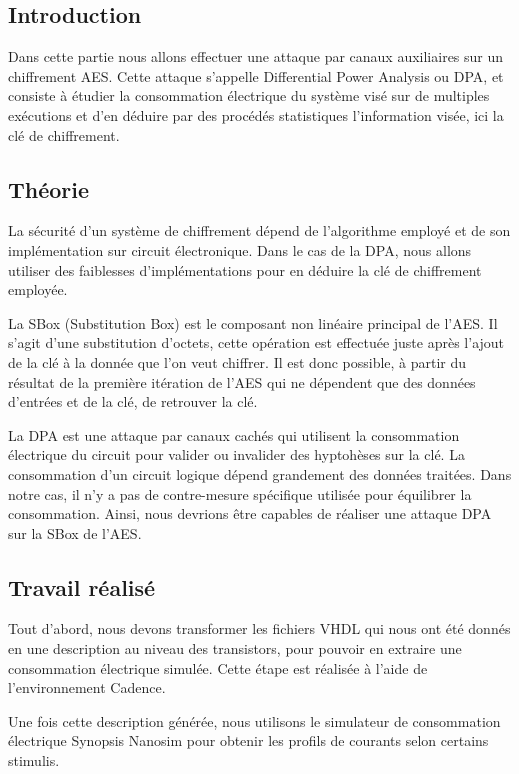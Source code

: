 \subsection{Introduction}

Dans cette partie nous allons effectuer une attaque par canaux auxiliaires
sur un chiffrement AES. Cette attaque s'appelle Differential Power Analysis ou
DPA, et consiste à étudier la consommation électrique du système visé sur de 
multiples exécutions et d'en déduire par des procédés statistiques l'information
visée, ici la clé de chiffrement.

\subsection{Théorie}
La sécurité d'un système de chiffrement dépend de l'algorithme employé et de 
son implémentation sur circuit électronique. Dans le cas de la DPA, nous allons 
utiliser des faiblesses d'implémentations pour en déduire la clé de chiffrement 
employée. 

La SBox (Substitution Box) est le composant non linéaire principal de l'AES. Il
s'agit d'une substitution d'octets, cette opération est effectuée juste après
l'ajout de la clé à la donnée que l'on veut chiffrer. Il est donc possible,
à partir du résultat de la première itération de l'AES qui ne dépendent que 
des données d'entrées et de la clé, de retrouver la clé.

La DPA est une attaque par canaux cachés qui utilisent la consommation
électrique du circuit pour valider ou invalider des hyptohèses sur la clé.
La consommation d'un circuit logique dépend grandement des données traitées.
Dans notre cas, il n'y a pas de contre-mesure spécifique utilisée pour
équilibrer la consommation. Ainsi, nous devrions être capables de réaliser
une attaque DPA sur la SBox de l'AES.

\subsection{Travail réalisé}

Tout d'abord, nous devons transformer les fichiers VHDL qui nous ont été donnés
en une description au niveau des transistors, pour pouvoir en extraire une
consommation électrique simulée. Cette étape est réalisée à l'aide de
l'environnement Cadence.

Une fois cette description générée, nous utilisons le simulateur de consommation
électrique Synopsis Nanosim pour obtenir les profils de courants selon certains 
stimulis.

